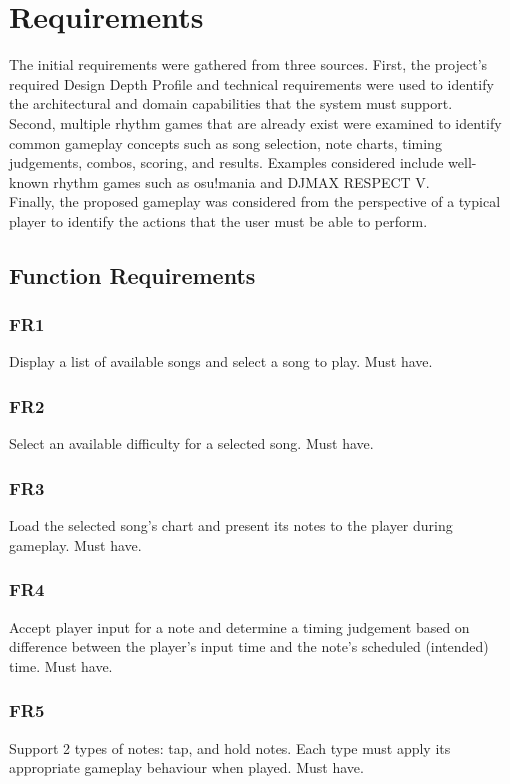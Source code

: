 \documentclass[12pt,a4paper]{article}
\newcommand\tab[1][1cm]{\hspace*{#1}}
\begin{document}
\section{Requirements}
\tab The initial requirements were gathered from three sources.
First, the project's required Design Depth Profile and technical requirements were used to identify the architectural and domain capabilities that the system must support. \\
\tab Second, multiple rhythm games that are already exist were examined to identify common gameplay concepts such as song selection, note charts, timing judgements, combos, scoring, and results.
Examples considered include well-known rhythm games such as osu!mania and DJMAX RESPECT V. \\
\tab Finally, the proposed gameplay was considered from the perspective of a typical player to identify the actions that the user must be able to perform.
    
    \subsection{Function Requirements}
        \subsubsection{FR1}
            Display a list of available songs and select a song to play. Must have.

        \subsubsection{FR2}
            Select an available difficulty for a selected song. Must have.

        \subsubsection{FR3}
            Load the selected song's chart and present its notes to the player during gameplay. Must have.

        \subsubsection{FR4}
            Accept player input for a note and determine a timing judgement based on difference between the player's input time and the note's scheduled (intended) time. Must have.

        \subsubsection{FR5}
            Support 2 types of notes: tap, and hold notes. Each type must apply its appropriate gameplay behaviour when played. Must have.
\end{document}

